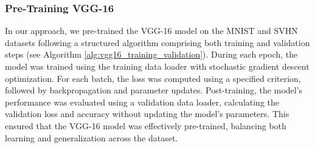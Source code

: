 \documentclass[conference]{IEEEtran}
\begin{document}
\FloatBarrier

\subsubsection{Pre-Training VGG-16}
In our approach, we pre-trained the VGG-16 model on the MNIST and SVHN datasets following a structured algorithm comprising both training and validation steps (see Algorithm \ref{alg:vgg16_training_validation}). During each epoch, the model was trained using the training data loader with stochastic gradient descent optimization. For each batch, the loss was computed using a specified criterion, followed by backpropagation and parameter updates. Post-training, the model's performance was evaluated using a validation data loader, calculating the validation loss and accuracy without updating the model's parameters. This ensured that the VGG-16 model was effectively pre-trained, balancing both learning and generalization across the dataset.
\end{document}
